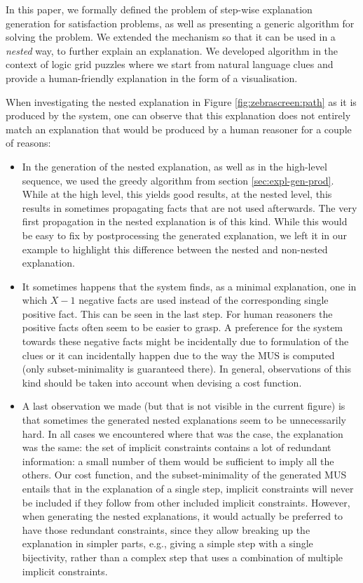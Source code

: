 In this paper, we formally defined the problem of step-wise explanation generation for satisfaction problems, as well as presenting a generic algorithm for solving the problem. We extended the mechanism so that it can be used in a \textit{nested} way, to further explain an explanation.
We developed algorithm in the context of logic grid puzzles where we start from natural language clues and provide a human-friendly explanation in the form of a visualisation. 

When investigating the nested explanation in Figure \ref{fig:zebrascreen:path} as it is produced by the system, one can observe that this explanation does not entirely match an explanation that would be produced by a human reasoner for a couple of reasons: 
\begin{itemize}
 \item In the generation of the nested explanation, as well as in the high-level sequence, we used the greedy algorithm from section \ref{sec:expl-gen-prod}. 
 While at the high level, this yields good results, at the nested level, this results in sometimes propagating facts that are not used afterwards. 
 The very first propagation in the nested explanation is of this kind.
 While this would be easy to fix by postprocessing the generated explanation, we left it in our example to highlight this difference between the nested and non-nested explanation. 
 \item It sometimes happens that the system finds, as a minimal explanation, one in which $X-1$ negative facts are used instead of the corresponding single positive fact. This can be seen in the last step. For human reasoners the positive facts often seem to be easier to grasp. A preference for the system towards these negative facts might be incidentally due to formulation of the clues or it can incidentally happen due to the way the MUS is computed (only subset-minimality is guaranteed there). 
 In general, observations of this kind should be taken into account when devising a cost function. 
 \item A last observation we made (but that is not visible in the current figure) is that sometimes the generated nested explanations seem to be unnecessarily hard. In all cases we encountered where that was the case, the explanation was the same: the set of implicit constraints contains a lot of redundant information: a small number of them would be sufficient to imply all the others. Our cost function, and the subset-minimality of the generated MUS entails that in the explanation of a single step, implicit constraints will never be included if they follow from other included implicit constraints. However, when generating the nested explanations, it would actually be preferred to have those redundant constraints, since they allow breaking up the explanation in simpler parts, e.g., giving a simple step with a single bijectivity, rather than a complex step that uses a combination of multiple implicit constraints.
\end{itemize}
